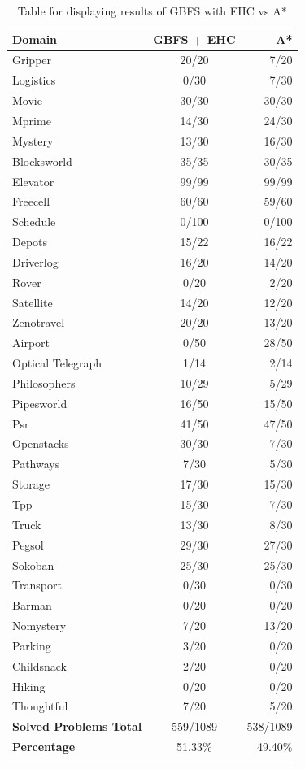\begin{center}
  \begin{longtable}{ | l | c | r |}
    \hline
    \textbf{Domain} & \textbf{GBFS + EHC} & \textbf{A*} \\ \hline
    Gripper & 20/20 & 7/20 \\ \hline
    Logistics & 0/30 & 7/30 \\ \hline
    Movie & 30/30 & 30/30 \\ \hline
    Mprime & 14/30 & 24/30 \\ \hline
    Mystery & 13/30 & 16/30 \\ \hline
    Blocksworld & 35/35 & 30/35 \\ \hline
    Elevator & 99/99 & 99/99 \\ \hline
    Freecell & 60/60 & 59/60 \\ \hline
    Schedule & 0/100 & 0/100 \\ \hline
    Depots & 15/22 & 16/22 \\ \hline
    Driverlog & 16/20 & 14/20 \\ \hline
    Rover & 0/20 & 2/20 \\ \hline
    Satellite & 14/20 & 12/20 \\ \hline
    Zenotravel & 20/20 & 13/20 \\ \hline
    Airport & 0/50 & 28/50 \\ \hline
    Optical Telegraph & 1/14 & 2/14 \\ \hline
    Philosophers & 10/29 & 5/29 \\ \hline
    Pipesworld & 16/50 & 15/50 \\ \hline
    Psr & 41/50 & 47/50\\ \hline
    Openstacks & 30/30 & 7/30 \\ \hline
    Pathways & 7/30 & 5/30 \\ \hline
    Storage & 17/30 & 15/30 \\ \hline
    Tpp & 15/30 & 7/30 \\ \hline
    Truck & 13/30 & 8/30 \\ \hline
    Pegsol & 29/30 & 27/30 \\ \hline
    Sokoban & 25/30 & 25/30 \\ \hline
    Transport & 0/30 & 0/30 \\ \hline
    Barman & 0/20 & 0/20 \\ \hline
    Nomystery & 7/20 & 13/20 \\ \hline
    Parking & 3/20 & 0/20 \\ \hline
    Childsnack & 2/20 & 0/20 \\ \hline
    Hiking & 0/20 & 0/20 \\ \hline
    Thoughtful & 7/20 & 5/20 \\ \hline
    \textbf{Solved Problems Total} & 559/1089 & 538/1089 \\ \hline
    \textbf{Percentage} & 51.33\% & 49.40\% \\  
    \hline
    \caption{Table for displaying results of GBFS with EHC vs A*}
  \end{longtable}
\end{center}
